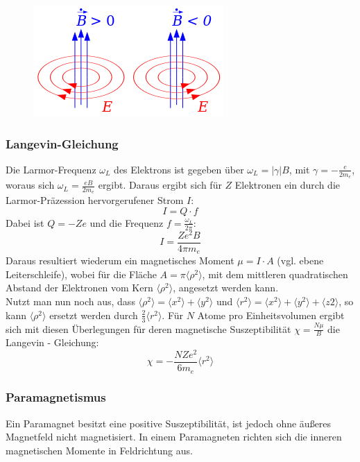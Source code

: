             \begin{figure}[H]
                \centering
                \includegraphics{Images/lenzRegel.png}
                \label{figLenz}
            \end{figure}
        \subsubsection*{Langevin-Gleichung}
        Die Larmor-Frequenz $\omega_L$ des Elektrons ist gegeben über $\omega_L = |\gamma | B$, mit $\gamma = -\frac{e}{2m_e}$, woraus sich $\omega_L = \frac{eB}{2m_e}$ ergibt. Daraus ergibt sich für $Z$ Elektronen ein durch die Larmor-Präzession hervorgerufener Strom $I$:
        \begin{equation}
        	I = Q \cdot f
        \end{equation}
        Dabei ist $Q = -Ze$ und die Frequenz $f = \frac{\omega_L}{2\pi}$:
        \begin{equation}
        	I = \frac{Ze^2 B}{4\pi m_e}
        \end{equation}
Daraus resultiert wiederum ein magnetisches Moment $\mu = I \cdot A$ (vgl. ebene Leiterschleife), wobei für die Fläche $A = \pi \langle \rho^2 \rangle$, mit dem mittleren quadratischen Abstand der Elektronen vom Kern $\langle \rho^2 \rangle$, angesetzt werden kann.\\
Nutzt man nun noch aus, dass $\langle \rho^2 \rangle = \langle x^2 \rangle + \langle y^2 \rangle$ und $\langle r^2 \rangle = \langle x^2 \rangle + \langle y^2 \rangle + \langle z2 \rangle$, so kann $\langle \rho^2 \rangle$ ersetzt werden durch $\frac{2}{3} \langle r^2 \rangle$. Für $N$ Atome pro Einheitsvolumen ergibt sich mit diesen Überlegungen für deren magnetische Suszeptibilität $\chi = \frac{N\mu}{B}$ die Langevin - Gleichung:
	\begin{equation}
		\chi = - \frac{NZe^2}{6m_e} \langle r^2 \rangle
	\end{equation}
        \subsubsection*{Paramagnetismus}
            Ein Paramagnet besitzt eine positive Suszeptibilität, ist jedoch ohne äußeres
            Magnetfeld nicht magnetisiert. In einem Paramagneten richten sich die inneren magnetischen Momente
            in Feldrichtung aus.
